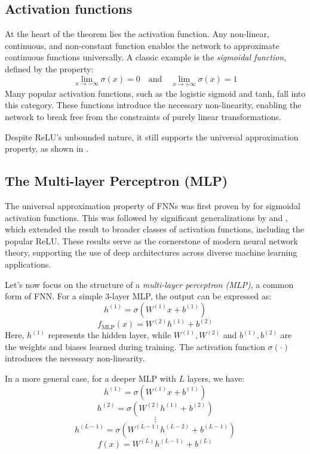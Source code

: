 \documentclass{article}
\theoremstyle{definition}
\theoremstyle{remark}
\begin{document}
\subsection{Activation functions} %
At the heart of the theorem lies the activation function. Any non-linear, continuous, and non-constant function enables the network to approximate continuous functions universally.
A classic example is the \textit{sigmoidal function}, defined by the property:
\[
\lim_{x \to -\infty} \sigma(x) = 0 \quad \text{and} \quad \lim_{x \to +\infty} \sigma(x) = 1
\]
Many popular activation functions, such as the logistic sigmoid and tanh, fall into this category.
These functions introduce the necessary non-linearity, enabling the network to break free from the constraints of purely linear transformations.

Despite ReLU's unbounded nature, it still supports the universal approximation property, as shown in \citep{yarotsky2017error}.



\subsection{The Multi-layer Perceptron (MLP)}

The universal approximation property of FNNs was first proven by \citep{cybenko1989approximation} for sigmoidal activation functions. This was followed by significant generalizations by \citep{hornik1989multilayer} and \citep{funahashi1989approximate}, which extended the result to broader classes of activation functions, including the popular ReLU.
These results serve as the cornerstone of modern neural network theory, supporting the use of deep architectures across diverse machine learning applications.


Let’s now focus on the structure of a \textit{multi-layer perceptron (MLP)}, a common form of FNN. For a simple 3-layer MLP, the output can be expressed as:
\[
h^{(1)} = \sigma(W^{(1)} x + b^{(1)})
\]
\[
f_{\text{MLP}}(x) = W^{(2)} h^{(1)} + b^{(2)}
\]
Here, \(h^{(1)}\) represents the hidden layer, while \(W^{(1)}, W^{(2)}\) and \(b^{(1)}, b^{(2)}\) are the weights and biases learned during training. The activation function \(\sigma(\cdot)\) introduces the necessary non-linearity.




In a more general case, for a deeper MLP with \(L\) layers, we have:
\[
h^{(1)} = \sigma(W^{(1)} x + b^{(1)})
\]
\[
h^{(2)} = \sigma(W^{(2)} h^{(1)} + b^{(2)})
\]
\[
\vdots
\]
\[
h^{(L-1)} = \sigma(W^{(L-1)} h^{(L-2)} + b^{(L-1)})
\]
\[
f(x) = W^{(L)} h^{(L-1)} + b^{(L)}
\]
\end{document}
